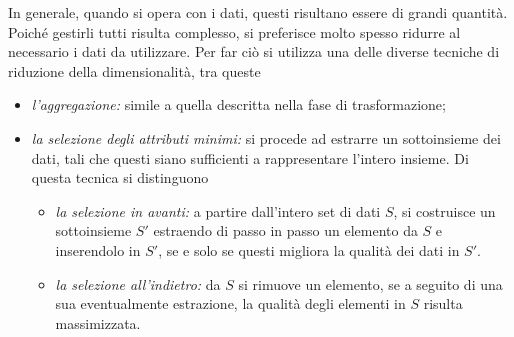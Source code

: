 \documentclass{subfiles}
\begin{document}
In generale, quando si opera con i dati, questi risultano essere di grandi quantità.
Poiché gestirli tutti risulta complesso, si preferisce molto spesso ridurre al necessario i dati da utilizzare.
Per far ciò si utilizza una delle diverse tecniche di riduzione della dimensionalità, tra queste
\begin{itemize}
    \item \emph{l'aggregazione:} simile a quella descritta nella fase di trasformazione;
    \item \emph{la selezione degli attributi minimi:} si procede ad estrarre un sottoinsieme dei dati,
          tali che questi siano sufficienti a rappresentare l'intero insieme.
          Di questa tecnica si distinguono
          \begin{itemize}
              \item \emph{la selezione in avanti:} a partire dall'intero set di dati \(S\),
                    si costruisce un sottoinsieme \(S'\) estraendo di passo in passo un elemento da \(S\) e inserendolo in \(S'\),
                    se e solo se questi migliora la qualità dei dati in \(S'\).

              \item \emph{la selezione all'indietro:} da \(S\) si rimuove un elemento, se a seguito di una sua eventualmente estrazione,
                    la qualità degli elementi in \(S\) risulta massimizzata.
          \end{itemize}
\end{itemize}
\end{document}
